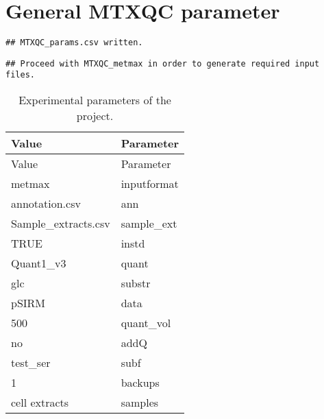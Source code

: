\documentclass[10pt,]{article}
\begin{document}
\section{General MTXQC parameter}\label{general-mtxqc-parameter}

\begin{verbatim}
## MTXQC_params.csv written.
\end{verbatim}

\begin{verbatim}
## Proceed with MTXQC_metmax in order to generate required input files.
\end{verbatim}

\begin{longtable}[]{@{}ll@{}}
\caption{Experimental parameters of the project.}\tabularnewline
\toprule
Value & Parameter\tabularnewline
\midrule
\endfirsthead
\toprule
Value & Parameter\tabularnewline
\midrule
\endhead
metmax & inputformat\tabularnewline
annotation.csv & ann\tabularnewline
Sample\_extracts.csv & sample\_ext\tabularnewline
TRUE & instd\tabularnewline
Quant1\_v3 & quant\tabularnewline
glc & substr\tabularnewline
pSIRM & data\tabularnewline
500 & quant\_vol\tabularnewline
no & addQ\tabularnewline
test\_ser & subf\tabularnewline
1 & backups\tabularnewline
cell extracts & samples\tabularnewline
\bottomrule
\end{longtable}
\newpage
\singlespacing 
\end{document}

